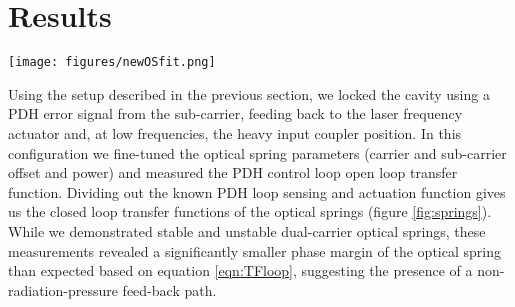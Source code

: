 

\section{Results}
\label{sec:res}

\begin{figure*}[thb]%
\centering
\texttt{[image: figures/newOSfit.png]}%
\caption{Data and modeled transfer function for a series of stable and unstable springs. The modeled transfer functions include the full coating and spot size correction, computed with the measured average absorption. Stable springs show a phase drop of 180 degrees at resonance, while unstable springs show a rise of 180 degrees.}%
\label{fig:springs}%
\end{figure*}


Using the setup described in the previous section, we locked the cavity using a PDH error signal from the sub-carrier, feeding back to the laser frequency actuator and, at low frequencies, the heavy input coupler position. In this configuration we fine-tuned the optical spring parameters (carrier and sub-carrier offset and power) and 
measured the PDH control loop open loop transfer function. Dividing out the known PDH loop sensing and actuation function gives us the closed loop transfer functions of the optical springs (figure \ref{fig:springs}). While we demonstrated stable and unstable dual-carrier optical springs, these measurements revealed a significantly smaller phase margin of the optical spring than expected based on equation \ref{eqn:TFloop}, suggesting the presence of a non-radiation-pressure feed-back path.

